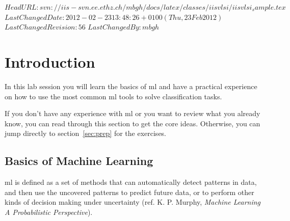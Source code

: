 \documentclass[parskip=half,notes,cadrem,toolver]{iisvlsi}
\date{\displaydate{date}}
\begin{document}
%
\svnidlong
{$HeadURL: svn://iis-svn.ee.ethz.ch/mbgh/docs/latex/classes/iisvlsi/iisvlsi_sample.tex $}
{$LastChangedDate: 2012-02-23 13:48:26 +0100 (Thu, 23 Feb 2012) $}
{$LastChangedRevision: 56 $}
{$LastChangedBy: mbgh $}
%
%
\maketitle
%

%
\section{Introduction}
In this lab session you will learn the basics of \gls{ml} and have a practical experience on how to use the most common \gls{ml} tools to solve classification tasks.

If you don't have any experience with \gls{ml} or you want to review what you already know, you can read through this section to get the core ideas. Otherwise, you can jump directly to section~\ref{sec:prep} for the exercises.

\subsection{Basics of Machine Learning}

\gls{ml} is defined as a set of methods that can automatically detect patterns in data, and then use the uncovered patterns to predict future data, or to perform other kinds of decision making under uncertainty (ref. K. P. Murphy, \textit{Machine Learning A Probabilistic Perspective}).
\end{document}

